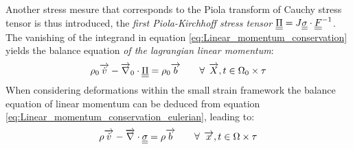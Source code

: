 Another stress mesure that corresponds to the Piola transform of Cauchy stress tensor is thus introduced, the \textit{first Piola-Kirchhoff stress tensor} ${\underline{\underline{\Pi}}}=J{\underline{\underline{\sigma}}}\cdot{\underline{\underline{F}}}^{-1}$. The vanishing of the integrand in equation \eqref{eq:Linear_momentum_conservation} yields the balance equation \textit{of the lagrangian linear momentum}:
\begin{equation}
  \label{eq:Lagrangian_linear_momentum}
  \rho_0 {\overrightarrow{\dot{v}}} - {\overrightarrow{\nabla}}_0 \cdot {\underline{\underline{\Pi}}} = \rho_0 {\overrightarrow{b}} \qquad \forall \: \: {\overrightarrow{X}},t \in \Omega_0 \times \tau 
\end{equation}
When considering deformations within the small strain framework the balance equation of linear momentum can be deduced from equation \eqref{eq:Linear_momentum_conservation_eulerian}, leading to:
\begin{equation}
  \label{eq:HPP_linear_momentum}
  \rho {\overrightarrow{\dot{v}}} - {\overrightarrow{\nabla}} \cdot {\underline{\underline{\sigma}}} = \rho {\overrightarrow{b}}  \qquad \forall \: \: {\overrightarrow{x}},t \in \Omega \times \tau 
\end{equation}

